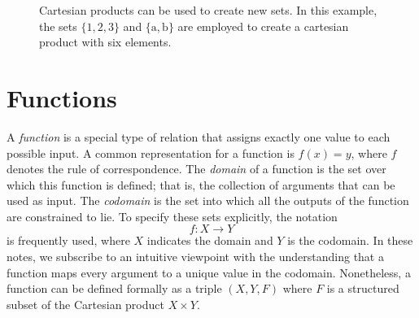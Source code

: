 \begin{figure}[htb]
\begin{center}
\begin{footnotesize}
\end{footnotesize}
\caption{Cartesian products can be used to create new sets.
In this example, the sets $\{ 1, 2, 3 \}$ and $\{ \mathrm{a}, \mathrm{b} \}$ are employed to create a cartesian product with six elements.}
\end{center}
\end{figure}


\section{Functions}

A \emph{function} is a special type of relation that assigns exactly one value to each possible input.
A common representation for a function is $f(x) = y$, where $f$ denotes the rule of correspondence.
The \emph{domain} of a function is the set over which this function is defined; that is, the collection of arguments that can be used as input.
The \emph{codomain} is the set into which all the outputs of the function are constrained to lie.
To specify these sets explicitly, the notation
\begin{equation*}
f: X \rightarrow Y
\end{equation*}
is frequently used, where $X$ indicates the domain and $Y$ is the codomain.
In these notes, we subscribe to an intuitive viewpoint with the understanding that a function maps every argument to a unique value in the codomain.
Nonetheless, a function can be defined formally as a triple $(X, Y, F)$ where $F$ is a structured subset of the Cartesian product $X \times Y$.

